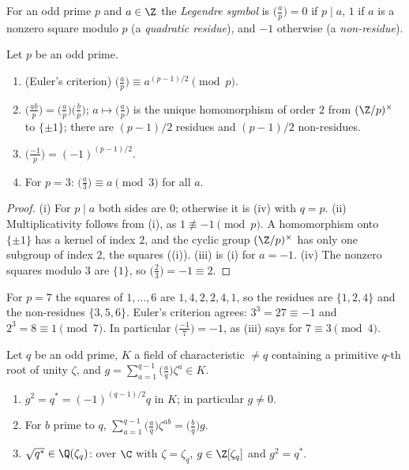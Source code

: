 \begin{definition}\label{def:rings:legendre}
For an odd prime $p$ and $a\in\Z$ the \emph{Legendre symbol} is $\bigl(\frac ap\bigr)=0$ if $p\mid a$, $1$ if $a$ is a nonzero square modulo $p$ (a
\emph{quadratic residue}), and $-1$ otherwise (a \emph{non-residue}).
\end{definition}

\begin{proposition}\label{prop:rings:legendre}
Let $p$ be an odd prime.
\begin{enumerate}[label=(\roman*)]
\item (Euler's criterion) $\bigl(\frac ap\bigr)\equiv a^{(p-1)/2}\pmod p$.
\item $\bigl(\frac{ab}p\bigr)=\bigl(\frac ap\bigr)\bigl(\frac bp\bigr)$; $a\mapsto\bigl(\frac ap\bigr)$ is the unique homomorphism of order $2$ from $(\Z/p)^\times$ to $\{\pm1\}$; there are $(p-1)/2$
residues and $(p-1)/2$ non-residues.
\item $\bigl(\frac{-1}p\bigr)=(-1)^{(p-1)/2}$.
\item For $p=3$: $\bigl(\frac a3\bigr)\equiv a\pmod3$ for all $a$.
\end{enumerate}
\end{proposition}

\begin{proof}
(i) For $p\mid a$ both sides are $0$; otherwise it is (iv) with $q=p$. (ii) Multiplicativity follows from (i), as
$1\not\equiv-1\pmod p$. A homomorphism onto $\{\pm1\}$ has a kernel of index $2$, and the cyclic group $(\Z/p)^\times$ has only one subgroup of
index $2$, the squares ((i)). (iii) is (i) for $a=-1$. (iv) The nonzero squares modulo $3$ are $\{1\}$, so $\bigl(\frac23\bigr)=-1\equiv2$.
\end{proof}

For $p=7$ the squares of $1,\dots,6$ are $1,4,2,2,4,1$, so the residues are $\{1,2,4\}$ and the non-residues $\{3,5,6\}$. Euler's criterion agrees:
$3^3=27\equiv-1$ and $2^3=8\equiv1\pmod7$. In particular $\bigl(\frac{-1}7\bigr)=-1$, as (iii) says for $7\equiv3\pmod4$.

\begin{proposition}\label{prop:rings:quadratic-gauss-sum}
Let $q$ be an odd prime, $K$ a field of characteristic $\ne q$ containing a primitive $q$-th root of unity $\zeta$, and
$g=\sum_{a=1}^{q-1}\bigl(\frac aq\bigr)\zeta^a\in K$.
\begin{enumerate}[label=(\roman*)]
\item $g^2=q^*=(-1)^{(q-1)/2}q$ in $K$; in particular $g\ne0$.
\item For $b$ prime to $q$, $\sum_{a=1}^{q-1}\bigl(\frac aq\bigr)\zeta^{ab}=\bigl(\frac bq\bigr)g$.
\item $\sqrt{q^*}\in\Q(\zeta_q)$: over $\C$ with $\zeta=\zeta_q$, $g\in\Z[\zeta_q]$ and $g^2=q^*$.
\end{enumerate}
\end{proposition}

